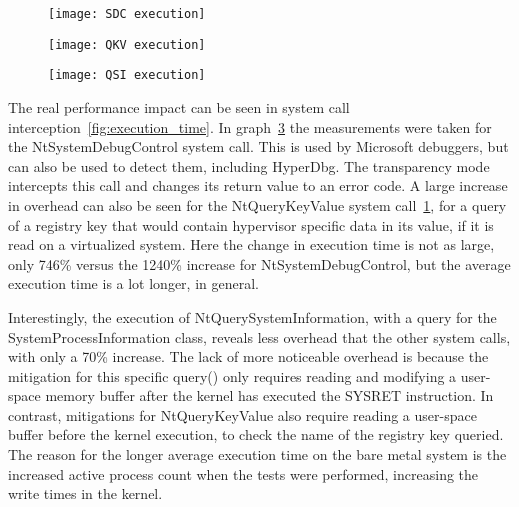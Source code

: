 \begin{figure*}[th]
    \begin{subfigure}[t]{\threecolgrid}
        \texttt{[image: SDC execution]}
        \sfigcap{}\label{fig:exec-time-a}
    \end{subfigure}
    \begin{subfigure}[t]{\threecolgrid}
        \texttt{[image: QKV execution]}
        \sfigcap{}\label{fig:exec-time-b}
    \end{subfigure}
    \begin{subfigure}[t]{\threecolgrid}
        \texttt{[image: QSI execution]}
        \sfigcap{}\label{fig:exec-time-c}
    \end{subfigure}
    \label{fig:execution_time}
\end{figure*}

The real performance impact can be seen in system call interception~\ref{fig:execution_time}. In graph~\ref{fig:exec-time-c} 
the measurements were taken for the NtSystemDebugControl system call. 
This is used by Microsoft debuggers, but can also be used to detect them, including HyperDbg. The transparency mode intercepts this call 
and changes its return value to an error code. A large increase in overhead can also be seen for the NtQueryKeyValue system call~\ref{fig:exec-time-a}, 
for a query of a registry key that would contain hypervisor specific data in its value, if it is read on a virtualized system.
Here the change in execution time is not as large, only 746\% versus the 1240\% increase for NtSystemDebugControl, but the average execution time is a lot longer, in general.

Interestingly, the execution of NtQuerySystemInformation, with a query for the SystemProcessInformation class, reveals less overhead that the other system calls, 
with only a 70\% increase. The lack of more noticeable overhead is because the mitigation for this specific query() 
only requires reading and modifying a user-space memory buffer after the kernel has executed the SYSRET instruction. In contrast, mitigations for NtQueryKeyValue 
also require reading a user-space buffer before the kernel execution, to check the name of the registry key queried. 
The reason for the longer average execution time on the bare metal system is the increased active process count when the tests were performed, increasing the write times in the kernel.

